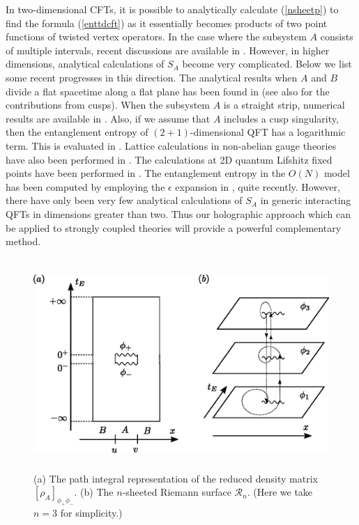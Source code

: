\documentclass[12pt]{article}
\def\ep{{\epsilon}}
\def\ep{\epsilon}
\def\ep{{\epsilon}}
\begin{document}
In two-dimensional CFTs, it is possible to analytically calculate
(\ref{nsheetp}) to find the formula (\ref{enttdcft})
\cite{HLW,Cardy,Casini05a,Casini05b,Casini:2007bt} as it essentially
becomes products of two point functions of twisted vertex operators.
In the case where the subsystem $A$ consists of multiple intervals,
recent discussions are available in
\cite{Casini:2008wt,Caraglio:2008pk,CCT}. However, in higher
dimensions, analytical calculations of $S_A$ become very
complicated. Below we list some recent progresses in this direction.
The analytical results when $A$ and $B$ divide a flat spacetime
along a flat plane has been found in
\cite{Kabat,Cardy,Nishioka:2006gr} (see also \cite{Fu} for the contributions 
from cusps). 
When the subsystem $A$ is a
straight strip, numerical results are available in
\cite{Casini05b,RuTaL}. Also, if we assume that $A$ includes a cusp
singularity, then the entanglement entropy of $(2+1)$-dimensional
QFT has a logarithmic term. This is evaluated in
\cite{Casini:2006hu,Casini:2008as}. Lattice calculations in
non-abelian gauge theories have also been performed in
\cite{Velytsky:2008rs, Buividovich:2008kq, Buividovich:2008gq,
Buividovich:2008yv}. The calculations at 2D quantum Lifshitz fixed points
have been performed in \cite{Frad}. The entanglement entropy in the $O(N)$ model
has been computed by employing the $\ep$ expansion in \cite{MFS},
quite recently. However, there have only been very few analytical
calculations of $S_A$ in generic interacting QFTs in dimensions
greater than two. Thus our holographic approach which can be applied
to strongly coupled theories will provide a powerful complementary
method.







\begin{figure}
\begin{center}
\includegraphics[height=8cm]{n-riemann.eps}
\end{center}
\caption{
\label{fig: n-riemann.eps}
(a)
The path integral representation of the reduced
density matrix $[\rho_A]_{\phi_+\phi_-}$.
(b)
The $n$-sheeted Riemann surface $\mathcal{R}_n$.
(Here we take $n=3$ for simplicity.)
}
\end{figure}
\end{document}
